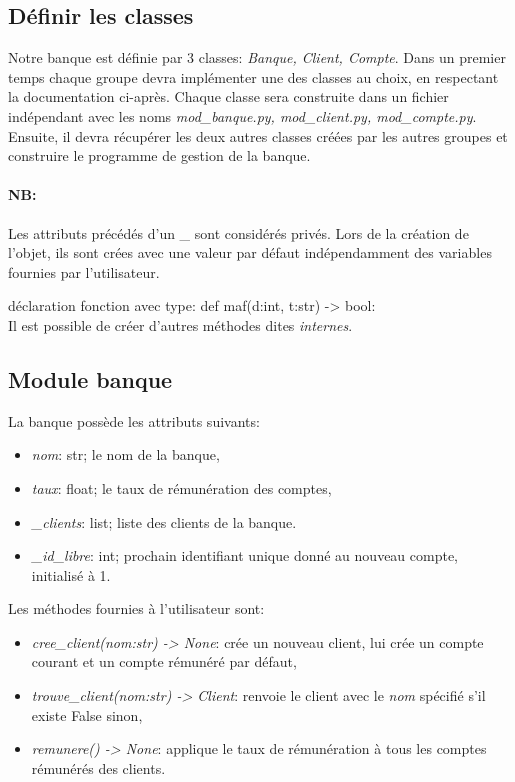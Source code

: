 \documentclass[a4paper,11pt]{article}
\begin{document}
\begin{Form}
\section{Définir les classes}
Notre banque est définie par 3 classes: \emph{Banque, Client, Compte}. Dans un premier temps chaque groupe devra implémenter une des classes au choix, en respectant la documentation ci-après. Chaque classe sera construite dans un fichier indépendant avec les noms \emph{mod\_banque.py, mod\_client.py, mod\_compte.py}. Ensuite, il devra récupérer les deux autres classes créées par les autres groupes et construire le programme de gestion de la banque.
\paragraph{NB:}Les attributs précédés d'un \_ sont considérés privés. Lors de la création de l'objet, ils sont crées avec une valeur par défaut indépendamment des variables fournies par l'utilisateur. 
\begin{commentprof}
déclaration fonction avec type:
def maf(d:int, t:str) -> bool:
\\Il est possible de créer d'autres méthodes dites \emph{internes}.
\end{commentprof}
\subsection{Module banque}
La banque possède les attributs suivants:
\begin{itemize}
\item \emph{nom}: str; le nom de la banque,
\item \emph{taux}: float; le taux de rémunération des comptes,
\item \emph{\_clients}: list; liste des clients de la banque.
\item \emph{\_id\_libre}: int; prochain identifiant unique donné au nouveau compte, initialisé à 1.
\end{itemize}
Les méthodes fournies à l'utilisateur sont:
\begin{itemize}
\item\emph{cree\_client(nom:str) -> None}: crée un nouveau client, lui crée un compte courant et un compte rémunéré par défaut,
\item \emph{trouve\_client(nom:str) -> Client}: renvoie le client avec le \emph{nom} spécifié s'il existe False sinon,
\item \emph{remunere() -> None}: applique le taux de rémunération à tous les comptes rémunérés des clients.
\end{itemize}

\end{Form}
\end{document}
